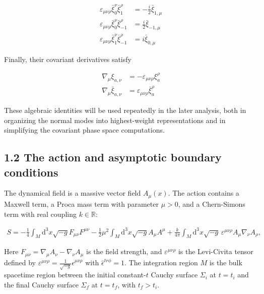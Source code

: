 \begin{align}
\varepsilon _{\mu \nu \rho}\bar{\xi}_{0}^{\nu}\bar{\xi}_{1}^{\rho} & =-\frac{i}{2}\bar{\xi}_{1,\mu} \\
\varepsilon _{\mu \nu \rho}\bar{\xi}_{0}^{\nu}\bar{\xi}_{-1}^{\rho} & =\frac{i}{2}\bar{\xi}_{-1,\mu} \\
\varepsilon _{\mu \nu \rho}\bar{\xi}_{1}^{\nu}\bar{\xi}_{-1}^{\rho} & =i\bar{\xi}_{0,\mu}
\end{align}

Finally, their covariant derivatives satisfy

\begin{align}
\nabla _{\mu}\xi _{a,\nu} & =-\varepsilon _{\mu \nu \rho}\xi _{a}^{\rho} \\
\nabla _{\mu}\bar{\xi}_{a,\nu} & =\varepsilon _{\mu \nu \rho}\bar{\xi}_{a}^{\rho}
\end{align}

These algebraic identities will be used repeatedly in the later analysis, both in organizing the normal modes into highest-weight representations and in simplifying the covariant phase space computations.

\subsection{1.2 The action and asymptotic boundary conditions}\label{subsec:proca-cs-action-boundary}

The dynamical field is a massive vector field $A_\mu(x)$. The action contains a Maxwell term, a Proca mass term with parameter $\mu > 0$, and a Chern-Simons term with real coupling $k \in \mathbb{R}$:

\begin{align}
S = -\frac{1}{4}\int_M \mathrm{d}^3x \sqrt{-g} F_{\mu\nu} F^{\mu\nu} - \frac{1}{2}\mu^2 \int_M \mathrm{d}^3x \sqrt{-g} A_\mu A^\mu + \frac{k}{4\pi} \int_M \mathrm{d}^3x \sqrt{-g} \, \varepsilon^{\mu\nu\rho} A_\mu \nabla_\nu A_\rho,
\end{align}

Here $F_{\mu\nu} = \nabla_\mu A_\nu - \nabla_\nu A_\mu$ is the field strength, and $\varepsilon^{\mu\nu\rho}$ is the Levi-Civita tensor defined by $\varepsilon^{\mu\nu\rho} = \frac{1}{\sqrt{-g}} \hat{\epsilon}^{\mu\nu\rho}$ with $\hat{\epsilon}^{tr\phi} = 1$. The integration region $M$ is the bulk spacetime region between the initial constant-$t$ Cauchy surface $\Sigma_i$ at $t=t_i$ and the final Cauchy surface $\Sigma_f$ at $t=t_f$, with $t_f > t_i$.


